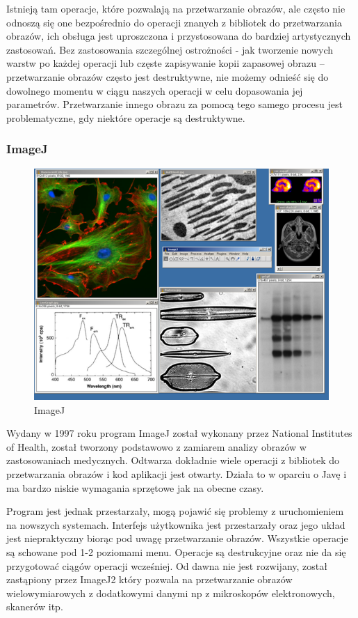 Istnieją tam operacje, które pozwalają na przetwarzanie obrazów, ale często nie odnoszą się one bezpośrednio do operacji znanych z bibliotek do przetwarzania obrazów, ich obsługa jest uproszczona i przystosowana do bardziej artystycznych zastosowań. 
Bez zastosowania szczególnej ostrożności - jak tworzenie nowych warstw po każdej operacji lub częste zapisywanie kopii zapasowej obrazu – przetwarzanie obrazów często jest destruktywne, nie możemy odnieść się do dowolnego momentu w ciągu naszych operacji w celu dopasowania jej parametrów. 
Przetwarzanie innego obrazu za pomocą tego samego procesu jest problematyczne, gdy niektóre operacje są destruktywne.

\subsubsection{ImageJ}
\begin{figure}[H]
    \centering
    \includegraphics[width=0.8\linewidth]{./images/Picture3.png}
    \caption{ImageJ}
    \label{fig:imagej}
\end{figure}
Wydany w 1997 roku program ImageJ został wykonany przez National Institutes of Health, został tworzony podstawowo z zamiarem analizy obrazów w zastosowaniach medycznych. 
Odtwarza dokładnie wiele operacji z bibliotek do przetwarzania obrazów i kod aplikacji jest otwarty. 
Działa to w oparciu o Javę i ma bardzo niskie wymagania sprzętowe jak na obecne czasy.

Program jest jednak przestarzały, mogą pojawić się problemy z uruchomieniem na nowszych systemach. Interfejs użytkownika jest przestarzały oraz jego układ jest niepraktyczny biorąc pod uwagę przetwarzanie obrazów. 
Wszystkie operacje są schowane pod 1-2 poziomami menu. Operacje są destrukcyjne oraz nie da się przygotować ciągów operacji wcześniej. 
Od dawna nie jest rozwijany, został zastąpiony przez ImageJ2 który pozwala na przetwarzanie obrazów wielowymiarowych z dodatkowymi danymi np z mikroskopów elektronowych, skanerów itp.

